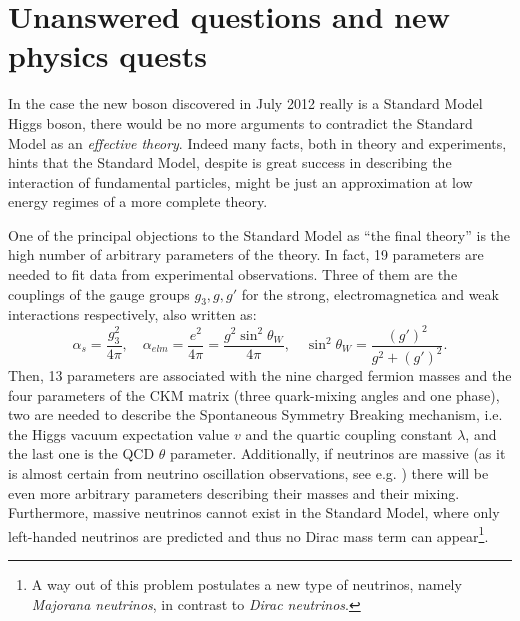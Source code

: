 
\section{Unanswered questions and new physics quests}\label{sec:THquest}

In the case the new boson discovered in July 2012 
really is a Standard Model Higgs boson, there would
be no more arguments to contradict the Standard Model
as an {\it effective theory}. Indeed many facts, both 
in theory and experiments, hints that the Standard Model,
despite is great success in describing the interaction
of fundamental particles, might be just an approximation
at low energy regimes of a more complete theory.

One of the principal objections to the Standard Model as 
``the final theory'' is the high number of arbitrary parameters 
of the theory. In fact, 19 parameters are needed to fit 
data from experimental observations. 
Three of them  are the couplings of the gauge groups 
$g_3, g, g'$ for the strong, electromagnetica and weak 
interactions respectively, also written as: 
\begin{equation}\label{eq:couplings}
\alpha_{s}=\dfrac{g_{3}^{2}}{4\pi} ,\quad 
\alpha_{elm} = \dfrac{e^{2}}{4\pi} =  \dfrac{g^{2}\sin^{2}\theta_{W}}{4\pi}, 
\quad \sin^{2}\theta_{W} = \dfrac{(g')^{2}}{g^{2}+(g')^{2}}.
\end{equation}
Then, 13 parameters are associated with the nine charged 
fermion masses and the four parameters of the CKM matrix 
(three quark-mixing angles and one phase), 
two are needed to describe the Spontaneous Symmetry Breaking mechanism, 
i.e. the Higgs vacuum expectation value $v$ and 
the quartic coupling constant $\lambda$, and the last one is the 
QCD $\theta$ parameter. Additionally, if neutrinos are massive 
(as it is almost certain from neutrino oscillation observations, 
see e.g. \cite{Langacker:817840}) there will be even more arbitrary 
parameters describing their masses and their mixing. 
Furthermore, massive neutrinos cannot exist in the Standard
Model, where only left-handed neutrinos are predicted and thus
no Dirac mass term can appear\footnote{A way out of this
problem postulates a new type of neutrinos, namely 
{\it Majorana neutrinos}, in contrast to {\it Dirac neutrinos}.}.


